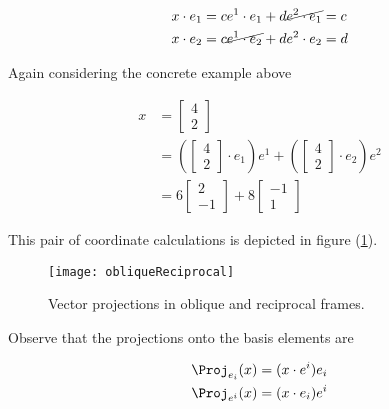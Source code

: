 \begin{equation}\label{eqn:grahamSchmidtLorentz:360}
\begin{aligned}
x \cdot e_1 &= c e^1 \cdot e_1 + d \cancel{e^2 \cdot e_1} = c \\
x \cdot e_2 &= c \cancel{e^1 \cdot e_2} + d e^2 \cdot e_2 = d
\end{aligned}
\end{equation}

Again considering the concrete example above

\begin{equation}\label{eqn:grahamSchmidtLorentz:290}
\begin{aligned}
x
&=
\begin{bmatrix}
4 \\
2
\end{bmatrix} \\
&=
\left(
\begin{bmatrix}
4 \\
2
\end{bmatrix}
\cdot e_1
\right)
e^1
+
\left(
\begin{bmatrix}
4 \\
2
\end{bmatrix}
\cdot e_2
\right)
e^2 \\
&= 6
\begin{bmatrix}
2 \\
-1
\end{bmatrix}
+
8
\begin{bmatrix}
-1 \\
1
\end{bmatrix}
\end{aligned}
\end{equation}

This pair of coordinate calculations is depicted in figure (\ref{fig:obliqueReciprocal}).

\begin{figure}[htp]
\centering
\texttt{[image: obliqueReciprocal]}
\caption{Vector projections in oblique and reciprocal frames.}\label{fig:obliqueReciprocal}
\end{figure}

Observe that the projections onto the basis elements are

\begin{align}\label{eqn:grahamSchmidtLorentz:940}
\Proj_{e_i}(x) &= (x \cdot e^i) e_i \\
\Proj_{e^i}(x) &= (x \cdot e_i) e^i
\end{align}

